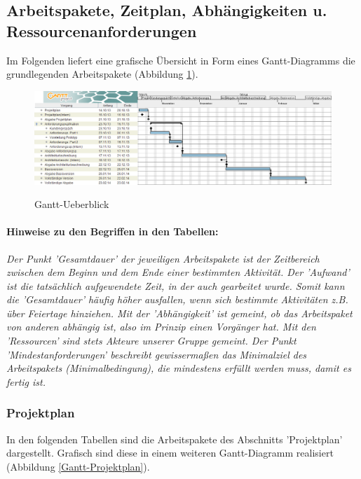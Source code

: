 \documentclass[fontsize=12pt,paper=a4,twoside]{scrartcl}
\begin{document}
\subsection{Arbeitspakete, Zeitplan, Abhängigkeiten u. Ressourcenanforderungen}\label{aps}

Im Folgenden liefert eine grafische Übersicht in Form eines Gantt-Diagramms die grundlegenden Arbeitspakete (Abbildung \ref{Gantt-Ueberblick}).\\

\begin{figure}[htbp]
\caption{Gantt-Ueberblick}
\includegraphics[scale=0.4]{Gantt-Ueberblick.png}
\label{Gantt-Ueberblick}
\end{figure}

\paragraph{Hinweise zu den Begriffen in den Tabellen:} \textit{Der Punkt 'Gesamtdauer' der jeweiligen Arbeitspakete ist der Zeitbereich zwischen dem Beginn und dem Ende einer bestimmten Aktivität. Der 'Aufwand' ist die tatsächlich aufgewendete Zeit, in der auch gearbeitet wurde. Somit kann die 'Gesamtdauer' häufig höher ausfallen, wenn sich bestimmte Aktivitäten z.B. über Feiertage hinziehen. Mit der 'Abhängigkeit' ist gemeint, ob das Arbeitspaket von anderen abhängig ist, also im Prinzip einen Vorgänger hat. Mit den 'Ressourcen' sind stets Akteure unserer Gruppe gemeint. Der Punkt 'Mindestanforderungen' beschreibt gewissermaßen das Minimalziel des Arbeitspakets (Minimalbedingung), die mindestens erfüllt werden muss, damit es fertig ist.}\\

\subsubsection{Projektplan}\label{aps}

In den folgenden Tabellen sind die Arbeitspakete des Abschnitts 'Projektplan' dargestellt. Grafisch sind diese in einem weiteren Gantt-Diagramm realisiert (Abbildung \ref{Gantt-Projektplan}). \\
\end{document}
